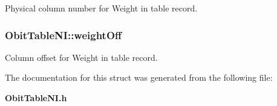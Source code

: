Physical column number for Weight in table record. 

\subsubsection{ {\bf Obit\-Table\-NI::weight\-Off}}\label{structObitTableNI_o29}


Column offset for Weight in table record. 



The documentation for this struct was generated from the following file:\begin{CompactItemize}
\item 
{\bf Obit\-Table\-NI.h}\end{CompactItemize}
